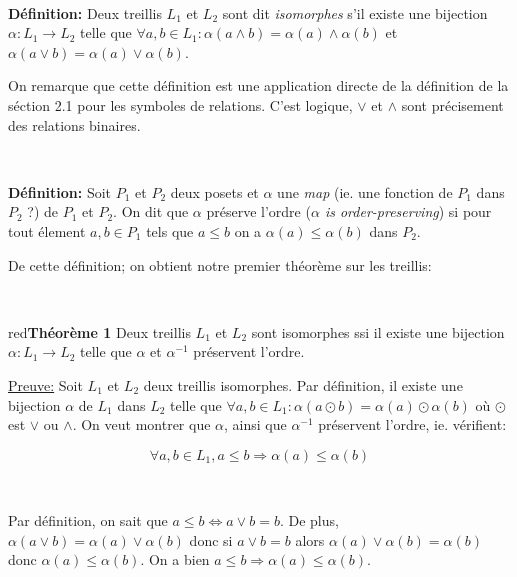 \documentclass[a4paper, 11pt]{article}
\begin{document}
\

\begin{tcolorbox} 
	\textbf{Définition:} Deux treillis $L_1$ et $L_2$ sont dit \textit{isomorphes} s'il existe une bijection \\
	$\alpha: L_1 \rightarrow L_2$ telle que $\forall a,b \in L_1: \alpha(a \land b) = \alpha(a) \land \alpha(b)$ et $\alpha(a \lor b) = \alpha(a) \lor \alpha(b)$.
\end{tcolorbox}

On remarque que cette définition est une application directe de la définition de la séction 2.1 pour les symboles de relations. C'est logique, $\lor$ et $\land$ sont précisement des relations binaires.

\

\begin{tcolorbox} 
	\textbf{Définition:} Soit $P_1$ et $P_2$ deux posets et $\alpha$ une \textit{map} (ie. une fonction de $P_1$ dans $P_2$ ?) de $P_1$ et $P_2$. On dit que $\alpha$ préserve l'ordre (\textit{$\alpha$ is order-preserving}) si pour tout élement $a,b \in P_1$ tels que $a \leq b$ on a $\alpha(a) \leq \alpha(b)$ dans $P_2$.
\end{tcolorbox}

De cette définition; on obtient notre premier théorème sur les treillis:

\

\begin{mybox}{red}{\textbf{Théorème 1}}
	Deux treillis $L_1$ et $L_2$ sont isomorphes ssi il existe une bijection $\alpha: L_1 \rightarrow L_2$ telle que $\alpha$ et $\alpha^{-1}$ préservent l'ordre. 
\end{mybox}

\noindent
\underline{Preuve:} Soit $L_1$ et $L_2$ deux treillis isomorphes. Par définition, il existe une bijection $\alpha$ de $L_1$ dans $L_2$ telle que $\forall a,b \in L_1: \alpha(a \odot b) = \alpha(a) \odot \alpha(b)$ où $\odot$ est $\lor$ ou $\land$. On veut montrer que $\alpha$, ainsi que $\alpha^{-1}$ préservent l'ordre, ie. vérifient:

$$\forall a,b \in L_1, a \leq b \Rightarrow \alpha(a) \leq \alpha(b)$$

\

Par définition, on sait que $a \leq b \Leftrightarrow a \lor b = b$. De plus, $\alpha(a \lor b) = \alpha(a) \lor \alpha(b)$ donc si $a \lor b = b$ alors $\alpha(a) \lor \alpha(b) = \alpha(b)$ donc $\alpha(a) \leq \alpha(b)$. On a bien $a \leq b \Rightarrow \alpha(a) \leq \alpha(b)$.
\end{document}
